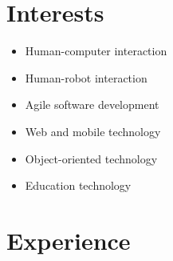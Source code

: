 \documentclass[11pt,a4paper,roman]{moderncv}        %
\begin{document}
\section{Interests}
\begin{itemize} \itemsep -1pt
    \item Human-computer interaction
    \item Human-robot interaction
    \item Agile software development
    \item Web and mobile technology
    \item Object-oriented technology 
    \item Education technology
\end{itemize}

\section{Experience}
\end{document}
